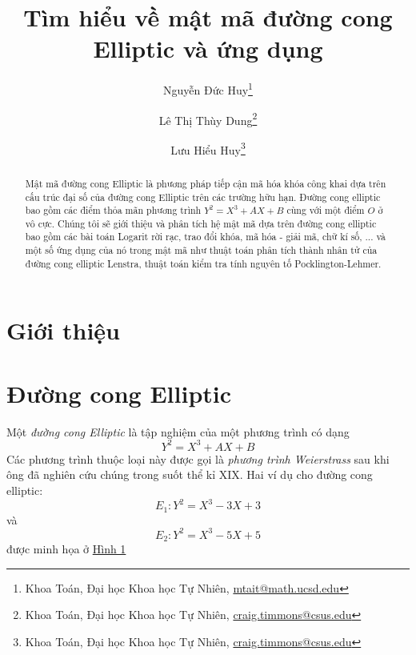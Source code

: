 \documentclass[12pt]{article}
\title{Tìm hiểu về mật mã đường cong Elliptic và ứng dụng}
\author{
    Nguyễn Đức Huy\thanks{Khoa Toán, Đại học Khoa học Tự Nhiên, \url{mtait@math.ucsd.edu}}
    \and
    Lê Thị Thùy Dung\thanks{Khoa Toán, Đại học Khoa học Tự Nhiên, \mbox{\url{craig.timmons@csus.edu}}}
    \and
    Lưu Hiểu Huy\thanks{Khoa Toán, Đại học Khoa học Tự Nhiên, \mbox{\url{craig.timmons@csus.edu}}}
}
\date{}
\begin{document}
\maketitle
\tableofcontents
\begin{abstract}
    Mật mã đường cong Elliptic là phương pháp tiếp cận mã hóa khóa công khai dựa trên cấu trúc đại số của đường cong Elliptic trên các trường hữu hạn.
    Đường cong elliptic bao gồm các điểm thỏa mãn phương trình $Y^2=X^3+AX+B$ cùng với một điểm $O$ ở vô cực. Chúng tôi sẽ giới thiệu và phân tích hệ mật mã
    dựa trên đường cong elliptic bao gồm các bài toán Logarit rời rạc, trao đổi khóa, mã hóa - giải mã, chữ kí số, ... và một số ứng dụng của nó trong mật mã
    như thuật toán phân tích thành nhân tử của đường cong elliptic Lenstra, thuật toán kiểm tra tính nguyên tố Pocklington-Lehmer.
\end{abstract}

\section{Giới thiệu}

\section{Đường cong Elliptic}
Một \textit{đường cong Elliptic} là tập nghiệm của một phương trình có dạng
$$Y^2 = X^3 + AX + B$$
Các phương trình thuộc loại này được gọi là \textit{phương trình Weierstrass} sau khi ông đã nghiên cứu chúng trong suốt thể kỉ XIX. Hai ví dụ cho đường cong elliptic:
$$ E_1: Y^2=X^3-3X+3 $$ và $$ E_2: Y^2=X^3-5X+5 $$ được minh họa ở \hyperref[fg:fg1]{Hình 1}
\end{document}
